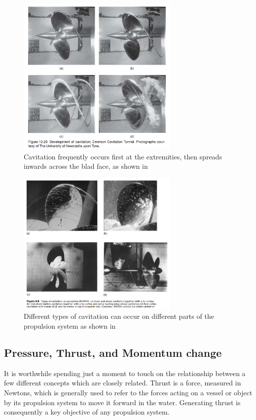 \documentclass{article}\usepackage[]{graphicx}\usepackage[]{color}
\begin{document}
\begin{figure}
\includegraphics[width=0.7\textwidth]{IncreasingCavitation.png}
\caption{Cavitation frequently occurs first at the extremities, then spreads inwards across the blad face, as shown in \parencite{mollard2011}}
\label{fig:IncreasingCavitation.png}
\end{figure}

\begin{figure}
\includegraphics[width=0.7\textwidth]{CavitationTypes.png}
\caption{Different types of cavitation can occur on different parts of the propulsion system as shown in \parencite{carlton2007}}
\label{fig:CavitationTypes.png}
\end{figure}


\subsection{Pressure, Thrust, and Momentum change}
It is worthwhile spending just a moment to touch on the relationship between a few different concepts which are closely related.  Thrust is a force, measured in Newtons, which is generally used to refer to the forces acting on a vessel or object by its propulsion system to move it forward in the water.  Generating thrust is consequently a key objective of any propulsion system.
\end{document}
